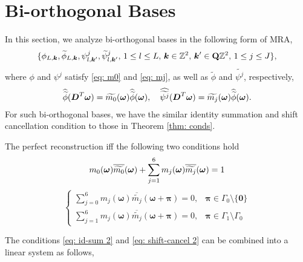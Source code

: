 \section{Bi-orthogonal Bases}\label{sec: bi-orth}
In this section, we analyze bi-orthogonal bases in the following form of MRA,
\begin{align}\label{eq: bi-orth MRA}
\{\phi_{L,\boldsymbol{k}},\widetilde{\phi}_{L,\boldsymbol{k}}, \psi_{l,\boldsymbol{k}'}^j,\widetilde{\psi}_{l,\boldsymbol{k}'}^j,\, 1\leq l\leq L,\,\boldsymbol{k}\in\mathbb{Z}^2,\, \boldsymbol{k}'\in\mathbf{Q}\mathbb{Z}^2,\,1\leq j\leq J \},
\end{align}
where $\phi$ and $\psi^j$ satisfy \eqref{eq: m0} and \eqref{eq: mj}, as well as $\widetilde{\phi}$ and $\widetilde{\psi^j}$, respectively,
\begin{align}\label{eq: mj_dual}
\widehat{\widetilde{\phi}}(\boldsymbol{D}^T\boldsymbol{\omega}) = \widetilde{m_0}(\boldsymbol{\omega})\widehat{\widetilde{\phi}}(\boldsymbol{\omega}),\quad \widehat{\widetilde{\psi^j}}(\boldsymbol{D}^T\boldsymbol{\omega}) = \widetilde{m_j}(\boldsymbol{\omega})\widehat{\widetilde{\phi}}(\boldsymbol{\omega}).
\end{align}
For such bi-orthogonal bases, we have the similar identity summation and shift cancellation condition to those in Theorem \ref{thm: conds}.
\begin{thm}\label{thm: bi-orth conds}
The perfect reconstruction iff the following two conditions hold
\begin{align}\label{eq: id-sum 2}
m_0(\boldsymbol{\omega})\overline{\widetilde{m_{0}}}(\boldsymbol{\omega}) + \sum_{j = 1}^6 m_j(\boldsymbol{\omega})\overline{\widetilde{m_{j}}}(\boldsymbol{\omega}) = 1
\end{align}
\begin{equation}\label{eq: shift-cancel 2}
\begin{cases}
\sum_{j = 0}^6m_j(\boldsymbol{\omega})\overline{\widetilde{m_j}}(\boldsymbol{\omega} + \boldsymbol{\pi}) = 0, & \boldsymbol{\pi}\in \Gamma_0\setminus\{\boldsymbol{0}\}\\[.5em]
\sum_{j=1}^6m_j(\boldsymbol{\omega})\overline{\widetilde{m_j}}(\boldsymbol{\omega}+\boldsymbol{\pi}) = 0, & \boldsymbol{\pi}\in\Gamma_1\setminus\Gamma_0
\end{cases}
\end{equation}
\end{thm}
The conditions \eqref{eq: id-sum 2} and \eqref{eq: shift-cancel 2} can be combined into a linear system as follows,

